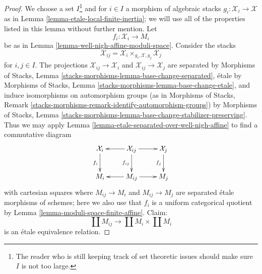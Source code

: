 \documentclass{stacks-project}
\theoremstyle{plain}
\theoremstyle{definition}
\theoremstyle{remark}
\numberwithin{equation}{subsection}
\begin{document}
\begin{proof}
We choose a set $I$\footnote{The reader who is still keeping
track of set theoretic issues should make sure $I$ is not too large.}
and for $i \in I$ a morphism of algebraic stacks
$g_i : \mathcal{X}_i \to \mathcal{X}$ as in
Lemma \ref{lemma-etale-local-finite-inertia}; we will use all
of the properties listed in this lemma without further mention.
Let
$$
f_i : \mathcal{X}_i \to M_i
$$
be as in Lemma \ref{lemma-well-nigh-affine-moduli-space}.
Consider the stacks
$$
\mathcal{X}_{ij} = \mathcal{X}_i \times_{g_i, \mathcal{X}, g_j} \mathcal{X}_j
$$
for $i, j \in I$. The projections $\mathcal{X}_{ij} \to \mathcal{X}_i$
and $\mathcal{X}_{ij} \to \mathcal{X}_j$ are separated
by Morphisms of Stacks, Lemma
\ref{stacks-morphisms-lemma-base-change-separated},
\'etale by Morphisms of Stacks, Lemma
\ref{stacks-morphisms-lemma-base-change-etale},
and induce isomorphisms on automorphism groups
(as in Morphisms of Stacks, Remark
\ref{stacks-morphisms-remark-identify-automorphism-groups}) by
Morphisms of Stacks, Lemma
\ref{stacks-morphisms-lemma-base-change-stabilizer-preserving}.
Thus we may apply Lemma \ref{lemma-etale-separated-over-well-nigh-affine}
to find a commutative diagram
$$
\xymatrix{
\mathcal{X}_i \ar[d]_{f_i} &
\mathcal{X}_{ij} \ar[d]_{f_{ij}} \ar[l] \ar[r] &
\mathcal{X}_j \ar[d]_{f_j} \\
M_i &
M_{ij} \ar[l] \ar[r] &
M_j
}
$$
with cartesian squares where $M_{ij} \to M_i$ and $M_{ij} \to M_j$
are separated \'etale morphisms of schemes; here we also use that $f_i$
is a uniform categorical quotient by
Lemma \ref{lemma-moduli-space-finite-affine}.
Claim:
$$
\coprod M_{ij} \longrightarrow \coprod M_i \times \coprod M_i
$$
is an \'etale equivalence relation.


\end{proof}
\end{document}
